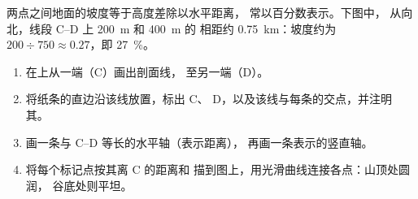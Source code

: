 两点之间地面的坡度等于高度差除以水平距离，
常以百分数表示。下图中，
从向北，线段 C--D 上 \qty{200}{m} 和 \qty{400}{m} 的
相距约 \qty{0.75}{km}：坡度约为 $200 \div 750
\approx 0.27$，即 \qty{27}{\%}。

\begin{method}[绘制地形剖面]
\begin{enumerate}
  \item 在上从一端（C）画出剖面线，
        至另一端（D）。
  \item 将纸条的直边沿该线放置，标出 C、
        D，以及该线与每条的交点，并注明
        其。
  \item 画一条与 C--D 等长的水平轴（表示距离），
        再画一条表示的竖直轴。
  \item 将每个标记点按其离 C 的距离和
        描到图上，用光滑曲线连接各点：山顶处圆润，
        谷底处则平坦。
\end{enumerate}
\end{method}

